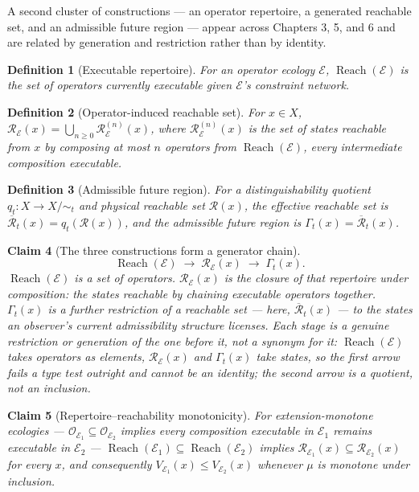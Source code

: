 \documentclass[12pt]{report}
\newtheorem{definition}{Definition}[section]
\newtheorem{claim}[definition]{Claim}
\newcommand{\Reach}{\ensuremath{\operatorname{Reach}}}
\begin{document}
A second cluster of constructions --- an operator repertoire, a
generated reachable set, and an admissible future region --- appear
across Chapters 3, 5, and 6 and are related by generation and
restriction rather than by identity.

\begin{definition}[Executable repertoire]
For an operator ecology $\mathcal{E}$, $\Reach(\mathcal{E})$ is the set
of operators currently executable given $\mathcal{E}$'s constraint
network.
\end{definition}

\begin{definition}[Operator-induced reachable set]
For $x \in X$, $\mathcal{R}_\mathcal{E}(x) = \bigcup_{n \geq 0}
\mathcal{R}_\mathcal{E}^{(n)}(x)$, where $\mathcal{R}_\mathcal{E}^{(n)}(x)$
is the set of states reachable from $x$ by composing at most $n$
operators from $\Reach(\mathcal{E})$, every intermediate composition
executable.
\end{definition}

\begin{definition}[Admissible future region]
For a distinguishability quotient $q_t : X \to X/{\sim_t}$ and physical
reachable set $\mathcal{R}(x)$, the effective reachable set is
$\overline{\mathcal{R}}_t(x) = q_t(\mathcal{R}(x))$, and the admissible
future region is $\Gamma_t(x) = \overline{\mathcal{R}}_t(x)$.
\end{definition}

\begin{claim}[The three constructions form a generator chain]
\[
\Reach(\mathcal{E}) \;\longrightarrow\; \mathcal{R}_\mathcal{E}(x) \;\longrightarrow\; \Gamma_t(x).
\]
$\Reach(\mathcal{E})$ is a set of operators. $\mathcal{R}_\mathcal{E}(x)$
is the closure of that repertoire under composition: the states
reachable by chaining executable operators together. $\Gamma_t(x)$ is a
further restriction of a reachable set --- here,
$\overline{\mathcal{R}}_t(x)$ --- to the states an observer's current
admissibility structure licenses. Each stage is a genuine restriction or
generation of the one before it, not a synonym for it: $\Reach(\mathcal{E})$
takes operators as elements, $\mathcal{R}_\mathcal{E}(x)$ and $\Gamma_t(x)$
take states, so the first arrow fails a type test outright and cannot be
an identity; the second arrow is a quotient, not an inclusion.
\end{claim}

\begin{claim}[Repertoire--reachability monotonicity]
For extension-monotone ecologies --- $\mathcal{O}_{\mathcal{E}_1}
\subseteq \mathcal{O}_{\mathcal{E}_2}$ implies every composition
executable in $\mathcal{E}_1$ remains executable in $\mathcal{E}_2$ ---
$\Reach(\mathcal{E}_1) \subseteq \Reach(\mathcal{E}_2)$ implies
$\mathcal{R}_{\mathcal{E}_1}(x) \subseteq \mathcal{R}_{\mathcal{E}_2}(x)$
for every $x$, and consequently $V_{\mathcal{E}_1}(x) \leq
V_{\mathcal{E}_2}(x)$ whenever $\mu$ is monotone under inclusion.
\end{claim}
\end{document}

